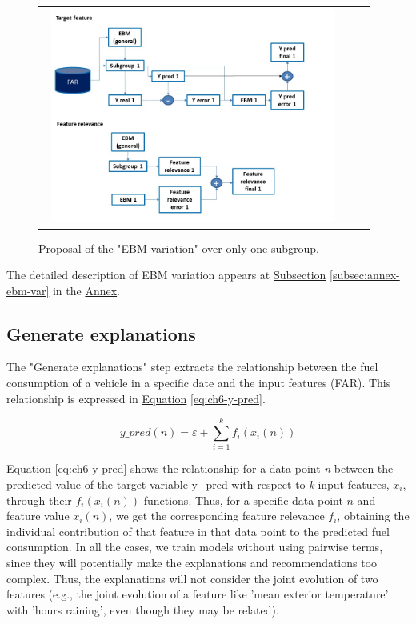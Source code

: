 \begin{figure}[h!]
\centering
 \begin{tabular}{c@{\qquad}c@{\qquad}c}
\includegraphics[width=280pt, height=200pt]{figures/chapter6_LucaFleet/EBM_variation.jpg}
  \end{tabular} 
  \caption{Proposal of the "EBM variation" over only one subgroup.  \label{fig:ch6-ebm-variation-flowchart}}
\end{figure}

The detailed description of EBM variation appears at \hyperref[subsec:annex-ebm-var]{Subsection} \ref{subsec:annex-ebm-var} in the \hyperref[ch:annex]{Annex}. 

\subsection{Generate explanations}\label{subsec:ch6-generate-explanations}
The "Generate explanations" step extracts the relationship between the fuel consumption of a vehicle in a specific date and the input features (FAR). This relationship is expressed in
\hyperref[eq:ch6-y-pred]{Equation} \ref{eq:ch6-y-pred}.

\begin{equation}\label{eq:ch6-y-pred}
y\_pred (n) = \varepsilon + \sum_{i=1}^{k}  f_{i}(x_{i}(n))
\end{equation}

\hyperref[eq:ch6-y-pred]{Equation} \ref{eq:ch6-y-pred} shows the relationship for a data point \textit{n} between the predicted value of the target variable y\_pred with respect to \textit{k} input features, $x_{i}$, through their $f_{i}(x_{i}(n))$ functions. Thus, for a specific data point $n$ and feature value $x_{i}(n)$, we get the corresponding feature relevance $f_{i}$, obtaining the individual contribution of that feature in that data point to the predicted fuel consumption.
In all the cases, we train models without using pairwise terms, since they will potentially make the explanations and recommendations too complex. Thus, the explanations will not consider the joint evolution of two features (e.g., the joint evolution of a feature like 'mean exterior temperature' with 'hours raining', even though they may be related).

